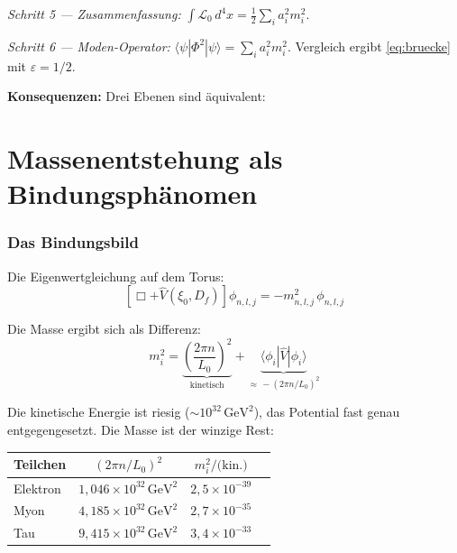 \textit{Schritt 5 — Zusammenfassung:}
$\int\mathcal{L}_0\,d^4x = \tfrac{1}{2}\sum_i a_i^2 m_i^2$.

\textit{Schritt 6 — Moden-Operator:}
$\langle\psi|\Phi^2|\psi\rangle = \sum_i a_i^2 m_i^2$.
Vergleich ergibt \eqref{eq:bruecke} mit $\varepsilon = 1/2$.

\textbf{Konsequenzen:} Drei Ebenen sind äquivalent:

\begin{center}
{\footnotesize
{}
}
\end{center}

\part{Massenentstehung als Bindungsphänomen}

\section{Das Bindungsbild}

Die Eigenwertgleichung auf dem Torus:
\begin{equation}
  \left[\Box + \hat{V}(\xi_0, D_f)\right]\phi_{n,l,j} = -m_{n,l,j}^2\,\phi_{n,l,j}
\end{equation}

Die Masse ergibt sich als Differenz:
\begin{equation}
  m_i^2
  = \underbrace{\left(\frac{2\pi n}{L_0}\right)^2}_{\text{kinetisch}}
  + \underbrace{\langle\phi_i|\hat{V}|\phi_i\rangle}_{\approx\,-(2\pi n/L_0)^2}
\end{equation}

Die kinetische Energie ist riesig ($\sim 10^{32}\,\text{GeV}^2$), das Potential
fast genau entgegengesetzt. Die Masse ist der winzige Rest:

\begin{center}
{\footnotesize
\begin{tabular}{lccl}
\toprule
\textbf{Teilchen} & \textbf{$(2\pi n/L_0)^2$} &
  \textbf{$m_i^2/\text{(kin.)}$} \\
\midrule
Elektron & $1{,}046\times10^{32}\,\text{GeV}^2$ & $2{,}5\times10^{-39}$ \\
Myon     & $4{,}185\times10^{32}\,\text{GeV}^2$ & $2{,}7\times10^{-35}$ \\
Tau      & $9{,}415\times10^{32}\,\text{GeV}^2$ & $3{,}4\times10^{-33}$ \\
\bottomrule
\end{tabular}
}
\end{center}

